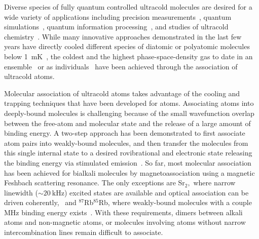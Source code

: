 \documentclass[aps,prl,twocolumn,superscriptaddress]{revtex4-1}
\begin{document}

Diverse species of fully quantum controlled  ultracold molecules are desired for a  wide variety of applications including precision measurements~\cite{Kondov2019,Nick_and_Ivan2017, PhysRevA.101.042504, Andreev2018, PhysRevLett.119.153001, hudson2011}, quantum simulations~\cite{Yao2018, Wall2015, Sundar2018, wall2015realizing}, quantum information processing~\cite{DeMille2002, Ni2018, Hudson2018, Lin2019}, and studies of ultracold chemistry~\cite{Bohn2017,Bala2016,Hu1111,Segev2019}.
While many innovative approaches demonstrated in the last few years have directly cooled different species of diatomic or polyatomic molecules below 1~mK~\cite{Norrgard2016,Anderegg2018, Mitra1366, PhysRevX.10.021049, PhysRevLett.121.013202, PhysRevLett.120.123201}, the coldest and the highest phase-space-density gas to date in an ensemble~\cite{Demarco2018} or as individuals~\cite{Zhang2020,He331}  have been achieved through the association of ultracold atoms.

Molecular association of ultracold atoms takes advantage of the cooling and trapping techniques that have been developed for atoms. Associating atoms into deeply-bound molecules is challenging because of the small wavefunction overlap between the free-atom and molecular state and the release of a large amount of binding energy. A two-step approach has been demonstrated to first associate atom pairs into weakly-bound molecules, and then transfer the molecules from this single internal state to a desired rovibrational and electronic state releasing the binding energy via stimulated emission~\cite{Danzl2008, Ni2008,Lang2008, Takekoshi2014, Molony2014, Park2015, Guo2016, Kondov2019, Voges2020}.
So far, most molecular association has been achieved for bialkali molecules by magnetoassociation using a magnetic Feshbach scattering resonance. The only exceptions are Sr$_2,$ where narrow linewidth ($\sim 20 ~\mathrm{kHz}$) excited states are available and optical association can be driven coherently,~\cite{Reinaudi2012,Stellmer2012} and $^{87}$Rb$^{85}$Rb, where weakly-bound molecules with a couple MHz binding energy exists~\cite{He331}. With these requirements, dimers between alkali atoms and non-magnetic atoms, or molecules involving atoms without narrow intercombination lines remain difficult to associate.
\end{document}
